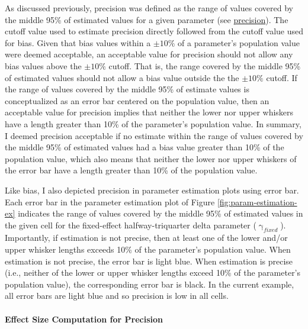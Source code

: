 \documentclass[
12pt, %
twoside,
english]{guelphthesis}
\theoremstyle{definition}
\theoremstyle{definition}
\theoremstyle{definition}
\theoremstyle{definition}
\theoremstyle{remark}
\begin{document}
As discussed previously, precision was defined as the range of values covered by the middle 95\% of estimated values for a given parameter (see \protect\hyperlink{precision-slow-exp3}{precision}). The cutoff value used to estimate precision directly followed from the cutoff value used for bias. Given that bias values within a \(\pm10\%\) of a parameter's population value were deemed acceptable, an acceptable value for precision should not allow any bias values above the \(\pm10\%\) cutoff. That is, the range covered by the middle 95\% of estimated values should not allow a bias value outside the the \(\pm10\%\) cutoff. If the range of values covered by the middle 95\% of estimate values is conceptualized as an error bar centered on the population value, then an acceptable value for precision implies that neither the lower nor upper whiskers have a length greater than 10\% of the parameter's population value. In summary, I deemed precision acceptable if no estimate within the range of values covered by the middle 95\% of estimated values had a bias value greater than 10\% of the population value, which also means that neither the lower nor upper whiskers of the error bar have a length greater than 10\% of the population value.

Like bias, I also depicted precision in parameter estimation plots using error bar. Each error bar in the parameter estimation plot of Figure \ref{fig:param-estimation-ex} indicates the range of values covered by the middle 95\% of estimated values in the given cell for the fixed-effect halfway-triquarter delta parameter (\(\upgamma_{fixed}\)). Importantly, if estimation is not precise, then at least one of the lower and/or upper whisker lengths exceeds 10\% of the parameter's population value. When estimation is not precise, the error bar is light blue. When estimation is precise (i.e., neither of the lower or upper whisker lengths exceed 10\% of the parameter's population value), the corresponding error bar is black. In the current example, all error bars are light blue and so precision is low in all cells.

\hypertarget{effect-size-computation-for-precision}{%
\paragraph{Effect Size Computation for Precision}\label{effect-size-computation-for-precision}}
\end{document}
